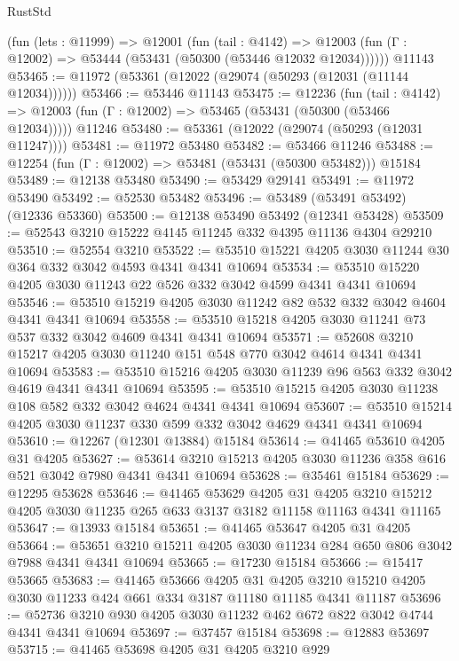 \begin{lexlean}{RustStd}
\begin{coremodule}
    (fun (lets : @11999) =>
    @12001
      (fun (tail : @4142) =>
      @12003 (fun (Γ : @12002) => @53444 (@53431 (@50300 (@53446 @12032 @12034))))))
    @11143
@53465 := @11972 (@53361 (@12022 (@29074 (@50293 (@12031 (@11144 @12034))))))
@53466 := @53446 @11143
@53475 := @12236
    (fun (tail : @4142) => @12003 (fun (Γ : @12002) => @53465 (@53431 (@50300 (@53466 @12034)))))
    @11246
@53480 := @53361 (@12022 (@29074 (@50293 (@12031 @11247))))
@53481 := @11972 @53480
@53482 := @53466 @11246
@53488 := @12254 (fun (Γ : @12002) => @53481 (@53431 (@50300 @53482))) @15184
@53489 := @12138 @53480
@53490 := @53429 @29141
@53491 := @11972 @53490
@53492 := @52530 @53482
@53496 := @53489 (@53491 @53492) (@12336 @53360)
@53500 := @12138 @53490 @53492 (@12341 @53428)
@53509 := @52543 @3210 @15222 @4145 @11245 @332 @4395 @11136 @4304 @29210
@53510 := @52554 @3210
@53522 := @53510 @15221 @4205 @3030 @11244 @30 @364 @332 @3042 @4593 @4341 @4341 @10694
@53534 := @53510 @15220 @4205 @3030 @11243 @22 @526 @332 @3042 @4599 @4341 @4341 @10694
@53546 := @53510 @15219 @4205 @3030 @11242 @82 @532 @332 @3042 @4604 @4341 @4341 @10694
@53558 := @53510 @15218 @4205 @3030 @11241 @73 @537 @332 @3042 @4609 @4341 @4341 @10694
@53571 := @52608 @3210 @15217 @4205 @3030 @11240 @151 @548 @770 @3042 @4614 @4341 @4341 @10694
@53583 := @53510 @15216 @4205 @3030 @11239 @96 @563 @332 @3042 @4619 @4341 @4341 @10694
@53595 := @53510 @15215 @4205 @3030 @11238 @108 @582 @332 @3042 @4624 @4341 @4341 @10694
@53607 := @53510 @15214 @4205 @3030 @11237 @330 @599 @332 @3042 @4629 @4341 @4341 @10694
@53610 := @12267 (@12301 @13884) @15184
@53614 := @41465 @53610 @4205 @31 @4205
@53627 := @53614 @3210 @15213 @4205 @3030 @11236 @358 @616 @521 @3042 @7980 @4341 @4341 @10694
@53628 := @35461 @15184
@53629 := @12295 @53628
@53646 := @41465
    @53629
    @4205
    @31
    @4205
    @3210
    @15212
    @4205
    @3030
    @11235
    @265
    @633
    @3137
    @3182
    @11158
    @11163
    @4341
    @11165
@53647 := @13933 @15184
@53651 := @41465 @53647 @4205 @31 @4205
@53664 := @53651 @3210 @15211 @4205 @3030 @11234 @284 @650 @806 @3042 @7988 @4341 @4341 @10694
@53665 := @17230 @15184
@53666 := @15417 @53665
@53683 := @41465
    @53666
    @4205
    @31
    @4205
    @3210
    @15210
    @4205
    @3030
    @11233
    @424
    @661
    @334
    @3187
    @11180
    @11185
    @4341
    @11187
@53696 := @52736 @3210 @930 @4205 @3030 @11232 @462 @672 @822 @3042 @4744 @4341 @4341 @10694
@53697 := @37457 @15184
@53698 := @12883 @53697
@53715 := @41465
    @53698
    @4205
    @31
    @4205
    @3210
    @929

\end{coremodule}
\end{lexlean}
